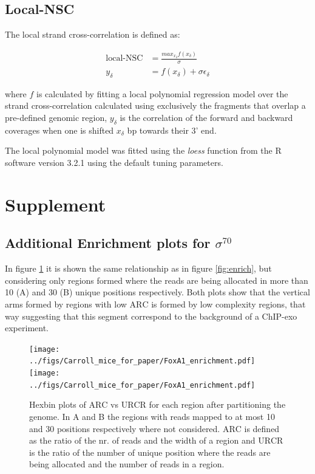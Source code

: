 \documentclass{bmcart}\usepackage[]{graphicx}\usepackage[]{color}
\begin{document}
\subsection{Local-NSC}
\label{sec:localnsc}

The local strand cross-correlation is defined as:

\begin{align}
  \mbox{local-NSC} &= \frac{max_{x_\delta} f(x_\delta)}{\sigma} \nonumber \\
 y_\delta &= f(x_\delta) + \sigma \epsilon_\delta \nonumber
\end{align}


where $f$ is calculated by fitting a local polynomial regression model
over the strand cross-correlation calculated using exclusively the
fragments that overlap a pre-defined genomic region, $y_\delta$ is the
correlation of the forward and backward coverages when one is shifted
$x_\delta$ bp towards their 3' end.

The local polynomial model was fitted using the \emph{loess} function
from the R software version 3.2.1 using the default tuning parameters.

\newpage



\nocite{exo_gb}
\nocite{maplot1}
\nocite{maplot2}
\nocite{chipbeyond}


\newpage

\section*{Supplement}
\label{sec:supp}


\subsection*{Additional Enrichment plots for $\sigma^{70}$}
\label{sec:enrichsup}

In figure \ref{fig:enrich2} it is shown the same relationship as in
figure \ref{fig:enrich}, but considering only regions formed where the
reads are being allocated in more than 10 (A) and 30 (B) unique
positions respectively. Both plots show that the vertical arms formed
by regions with low $\mbox{ARC}$ is formed by low complexity regions,
that way suggesting that this segment correspond to the background of
a ChIP-exo experiment.

\begin{figure}[h!]
  \centering
  \texttt{[image: ../figs/Carroll\_mice\_for\_paper/FoxA1\_enrichment.pdf]}
  \texttt{[image: ../figs/Carroll\_mice\_for\_paper/FoxA1\_enrichment.pdf]}
  \caption{Hexbin plots of $\mbox{ARC}$ vs $\mbox{URCR}$ for each
    region after partitioning the genome. In A and B the regions with
    reads mapped to at most 10 and 30 positions respectively where not
    considered. $\mbox{ARC}$ is defined as the ratio of the nr. of
    reads and the width of a region and $\mbox{URCR}$ is the ratio of
    the number of unique position where the reads are being allocated
    and the number of reads in a region.}
  \label{fig:enrich2}
\end{figure}
\end{document}
